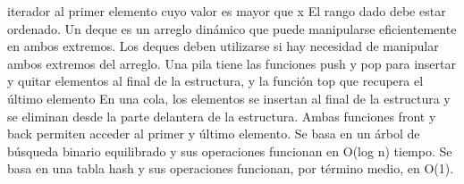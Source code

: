 {}iterador al primer elemento cuyo valor es mayor que x\markdownRendererInterblockSeparator
{}\markdownRendererInterblockSeparator
{}El rango dado debe estar ordenado.\markdownRendererInterblockSeparator
{}
\markdownRendererSectionEnd 
\markdownRendererSectionEnd \markdownRendererSectionBegin
{}\markdownRendererInterblockSeparator
{}Un deque es un arreglo dinámico que puede manipularse eficientemente en ambos extremos.\markdownRendererParagraphSeparator
{}Los deques deben utilizarse si hay necesidad de manipular ambos extremos del arreglo.\markdownRendererInterblockSeparator
{}\markdownRendererParagraphSeparator
{}
\markdownRendererSectionEnd \markdownRendererSectionBegin
{}\markdownRendererInterblockSeparator
{}Una pila tiene las funciones push y pop para insertar y quitar elementos al final de la estructura, y la función top que recupera el último elemento\markdownRendererInterblockSeparator
{}\markdownRendererInterblockSeparator
{}
\markdownRendererSectionEnd \markdownRendererSectionBegin
{}\markdownRendererInterblockSeparator
{}En una cola, los elementos se insertan al final de la estructura y se eliminan desde la parte delantera de la estructura. Ambas funciones front y back permiten acceder al primer y último elemento.\markdownRendererInterblockSeparator
{}\markdownRendererInterblockSeparator
{}
\markdownRendererSectionEnd 
\markdownRendererSectionEnd \markdownRendererSectionBegin
{}\markdownRendererInterblockSeparator
{}\markdownRendererSectionBegin
{}\markdownRendererInterblockSeparator
{}\markdownRendererSectionBegin
{}\markdownRendererInterblockSeparator
{}Se basa en un árbol de búsqueda binario equilibrado y sus operaciones funcionan en \markdownRendererDollarSign{}O(log n)\markdownRendererDollarSign{} tiempo.\markdownRendererInterblockSeparator
{}
\markdownRendererSectionEnd \markdownRendererSectionBegin
{}\markdownRendererInterblockSeparator
{}Se basa en una tabla hash y sus operaciones funcionan, por término medio, en \markdownRendererDollarSign{}O(1)\markdownRendererDollarSign{}.\markdownRendererParagraphSeparator
